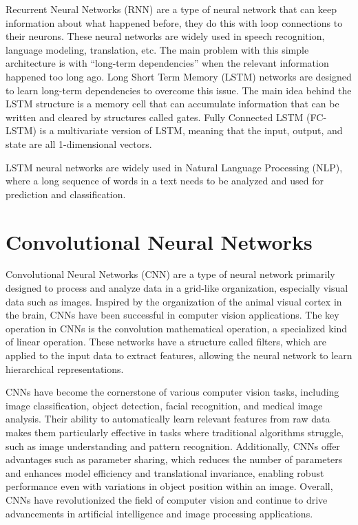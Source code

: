 Recurrent Neural Networks (RNN) are a type of neural network that can keep information about what happened before, they do this with loop connections to their neurons. These neural networks are widely used in speech recognition, language modeling, translation, etc. The main problem with this simple architecture is with “long-term dependencies” when the relevant information happened too long ago. Long Short Term Memory (LSTM) networks are designed to learn long-term dependencies to overcome this issue. The main idea behind the LSTM structure is a memory cell that can accumulate information that can be written and cleared by structures called gates. Fully Connected LSTM (FC-LSTM) is a multivariate version of LSTM, meaning that the input, output, and state are all 1-dimensional vectors.

LSTM neural networks are widely used in Natural Language Processing (NLP), where a long sequence of words in a text needs to be analyzed and used for prediction and classification.

\section{Convolutional Neural Networks}
\label{sec:CNN}

Convolutional Neural Networks (CNN) are a type of neural network primarily designed to process and analyze data in a grid-like organization, especially visual data such as images. Inspired by the organization of the animal visual cortex in the brain, CNNs have been successful in computer vision applications. The key operation in CNNs is the convolution mathematical operation, a specialized kind of linear operation. These networks have a structure called filters, which are applied to the input data to extract features, allowing the neural network to learn hierarchical representations.

CNNs have become the cornerstone of various computer vision tasks, including image classification, object detection, facial recognition, and medical image analysis. Their ability to automatically learn relevant features from raw data makes them particularly effective in tasks where traditional algorithms struggle, such as image understanding and pattern recognition. Additionally, CNNs offer advantages such as parameter sharing, which reduces the number of parameters and enhances model efficiency and translational invariance, enabling robust performance even with variations in object position within an image. Overall, CNNs have revolutionized the field of computer vision and continue to drive advancements in artificial intelligence and image processing applications.

